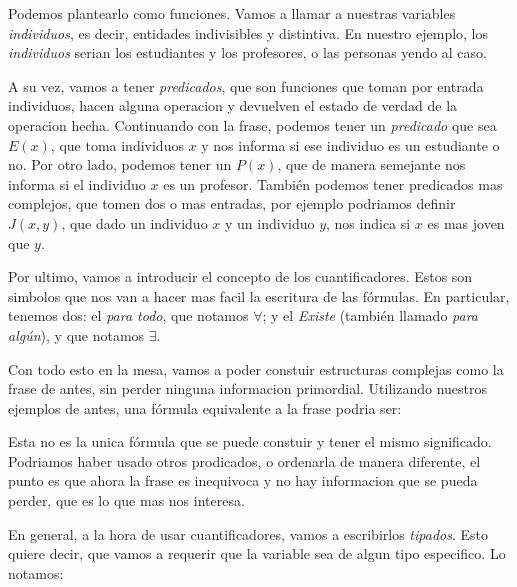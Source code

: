 \documentclass{article}
\begin{document}



Podemos plantearlo como funciones. Vamos a llamar a nuestras variables \textit{individuos}, es decir, entidades indivisibles y distintiva. En nuestro ejemplo, los \textit{individuos} serian los estudiantes y los profesores, o las personas yendo al caso.

A su vez, vamos a tener \textit{predicados}, que son funciones que toman por entrada individuos, hacen alguna operacion y devuelven el estado de verdad de la operacion hecha. Continuando con la frase, podemos tener un \textit{predicado} que sea $E(x)$, que toma individuos $x$ y nos informa si ese individuo es un estudiante o no. Por otro lado, podemos tener un $P(x)$, que de manera semejante nos informa si el individuo $x$ es un profesor. También podemos tener predicados mas complejos, que tomen dos o mas entradas, por ejemplo podriamos definir $J(x, y)$, que dado un individuo $x$ y un individuo $y$, nos indica si $x$ es mas joven que $y$.

Por ultimo, vamos a introducir el concepto de los cuantificadores. Estos son simbolos que nos van a hacer mas facil la escritura de las fórmulas. En particular, tenemos dos: el \textit{para todo}, que notamos $\forall$; y el \textit{Existe} (también llamado \textit{para algún}), y que notamos $\exists$.

Con todo esto en la mesa, vamos a poder constuir estructuras complejas como la frase de antes, sin perder ninguna informacion primordial. Utilizando nuestros ejemplos de antes, una fórmula equivalente a la frase podria ser:


Esta no es la unica fórmula que se puede constuir y tener el mismo significado. Podriamos haber usado otros prodicados, o ordenarla de manera diferente, el punto es que ahora la frase es inequivoca y no hay informacion que se pueda perder, que es lo que mas nos interesa.

En general, a la hora de usar cuantificadores, vamos a escribirlos \textit{tipados}. Esto quiere decir, que vamos a requerir que la variable sea de algun tipo especifico. Lo notamos:

\begin{multicols}{2}
	
\end{multicols}
\end{document}
